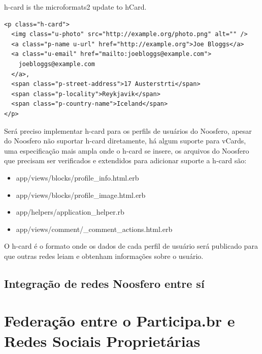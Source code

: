 \documentclass[12pt]{article}
\begin{document}
h-card is the microformats2 update to hCard.

\begin{framed}
\begin{lstlisting}[caption=Exemplo de h-card]
<p class="h-card">
  <img class="u-photo" src="http://example.org/photo.png" alt="" />
  <a class="p-name u-url" href="http://example.org">Joe Bloggs</a>
  <a class="u-email" href="mailto:joebloggs@example.com">
    joebloggs@example.com
  </a>, 
  <span class="p-street-address">17 Austerstrti</span>
  <span class="p-locality">Reykjavik</span>
  <span class="p-country-name">Iceland</span>
</p>
\end{lstlisting}
\end{framed}

Será preciso implementar h-card para os perfils de usuários do Noosfero,
apesar do Noosfero não suportar h-card diretamente, há algum suporte para
vCards, uma especificação mais ampla onde o h-card se insere, os arquivos do
Noosfero que precisam ser verificados e extendidos para adicionar suporte a
h-card são:

\begin{itemize}
  \item app/views/blocks/profile\_info.html.erb
  \item app/views/blocks/profile\_image.html.erb
  \item app/helpers/application\_helper.rb
  \item app/views/comment/\_comment\_actions.html.erb
\end{itemize}

O h-card é o formato onde os dados de cada perfil de usuário será publicado
para que outras redes leiam e obtenham informações sobre o usuário.

\subsection{Integração de redes Noosfero entre sí}


\section{Federação entre o Participa.br e Redes Sociais Proprietárias}

\end{document}
